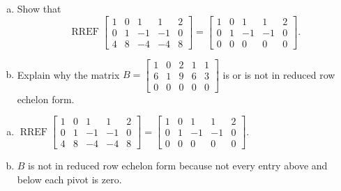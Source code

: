 
\begin{exerciseStatement}

\begin{enumerate}[(a)]
\item Show that \[\operatorname{RREF} \left[\begin{array}{ccccc}
1 & 0 & 1 & 1 & 2 \\
0 & 1 & -1 & -1 & 0 \\
4 & 8 & -4 & -4 & 8
\end{array}\right] = \left[\begin{array}{ccccc}
1 & 0 & 1 & 1 & 2 \\
0 & 1 & -1 & -1 & 0 \\
0 & 0 & 0 & 0 & 0
\end{array}\right] .\]
\item Explain why the matrix \(B= \left[\begin{array}{ccccc}
1 & 0 & 2 & 1 & 1 \\
6 & 1 & 9 & 6 & 3 \\
0 & 0 & 0 & 0 & 0
\end{array}\right] \) is or is not in reduced row echelon form.
\end{enumerate}
    
\end{exerciseStatement}
    
\begin{exerciseAnswer} 

\begin{enumerate}[(a)]
\item \(\operatorname{RREF} \left[\begin{array}{ccccc}
1 & 0 & 1 & 1 & 2 \\
0 & 1 & -1 & -1 & 0 \\
4 & 8 & -4 & -4 & 8
\end{array}\right] = \left[\begin{array}{ccccc}
1 & 0 & 1 & 1 & 2 \\
0 & 1 & -1 & -1 & 0 \\
0 & 0 & 0 & 0 & 0
\end{array}\right] .\)
\item \(B\) is not in reduced row echelon form because not every entry above and below each pivot is zero. 
\end{enumerate}
    
\end{exerciseAnswer}
    
